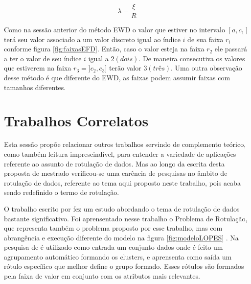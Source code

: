 \begin{equation}
\lambda = \frac{\xi}{R}
 \label{eq:pontocorteEFD}
\end{equation}

Como na sessão anterior do método EWD o valor que estiver no intervalo ${[a,c_1]}$ terá seu valor associado a um valor discreto igual ao índice ${i}$ de sua faixa ${r_i}$ conforme figura \ref{fig:faixasEFD}. Então, caso o valor esteja na faixa ${r_2}$ ele passará a ter o valor de seu índice ${i}$ igual a ${2(dois)}$. De maneira consecutiva os valores que estiverem na faixa ${r_3=]c_2,c_3]}$ terão valor ${3(três)}$. Uma outra observação desse método é que diferente do EWD, as faixas podem assumir faixas com tamanhos diferentes.

\section{Trabalhos Correlatos}\label{cap:refTeor:sec:trabcorrel}

Esta sessão propõe relacionar outros trabalhos servindo de complemento teórico, como também leitura imprescindível, para entender a variedade de aplicações referente ao assunto de rotulação de dados. Mas ao longo da escrita desta proposta de mestrado verificou-se uma carência de pesquisas no âmbito de rotulação de dados, referente ao tema aqui proposto neste trabalho, pois  acaba sendo redefinido o termo de rotulação.

O trabalho escrito por \cite{Lopes} fez um estudo abordando o tema de rotulação de dados bastante significativo. Foi aprensentado nesse trabalho o Problema de Rotulação, que representa também o problema proposto por esse trabalho, mas com abrangência e execução diferente do modelo \cite{Lopes}  na figura \ref{fig:modeloLOPES} . Na pesquisa de \cite{Lopes} é utilizado como entrada um conjunto  dados onde é feito um agrupamento automático formando os clusters, e aprensenta como saída um rótulo específico que melhor define o grupo formado. Esses rótulos são formados pela faixa de valor em conjunto com os atributos mais relevantes.

